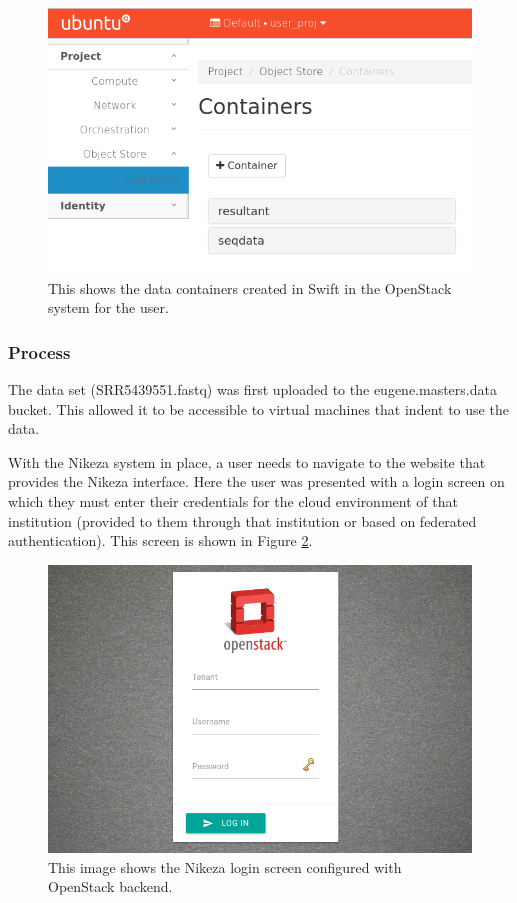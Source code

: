 \begin{figure}[h!]
\centering
\includegraphics[width=\textwidth]{Figures/4_os_swift_prep.png}
\decoRule
\caption[OpenStack Swift Containers for Testing]{This shows the data containers created in Swift in the OpenStack system for the user.}
\label{fig:swift_prep}
\end{figure}

\subsubsection{Process}

The data set (SRR5439551.fastq) was first uploaded to the eugene.masters.data bucket. This allowed it to be accessible to virtual machines that indent to use the data.

With the Nikeza system in place, a user needs to navigate to the website that provides the Nikeza interface. Here the user was presented with a login screen on which they must enter their credentials for the cloud environment of that institution (provided to them through that institution or based on federated authentication). This screen is shown in Figure \ref{fig:os_login}.

\begin{figure}[h!]
\centering
\includegraphics[width=\textwidth]{Figures/4_os_login.png}
\decoRule
\caption[Nikeza Login Screen]{This image shows the Nikeza login screen configured with OpenStack backend.}
\label{fig:os_login}
\end{figure}

